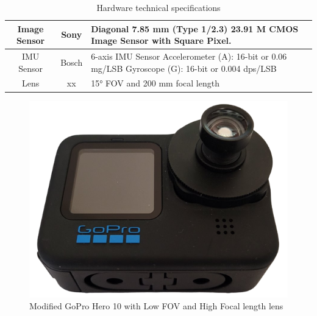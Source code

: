 \begin{table}[H]
    \centering
\begin{tabular}{ c| c | L }

     Image Sensor & 
     Sony & 
     Diagonal 7.85 mm (Type 1/2.3) 23.91 M CMOS Image Sensor with Square Pixel. \\
     \hline
     
     IMU Sensor & 
     Bosch & 
     6-axis IMU Sensor
     Accelerometer (A): 16-bit or 0.06 mg/LSB 
     Gyroscope (G): 16-bit or 0.004 dps/LSB  \\
     \hline
     
     Lens & 
     xx & 
     15° FOV and 200 mm focal length \\

\end{tabular}
    \caption{Hardware technical specifications}
    \label{tab:technical_details}
\end{table}

\begin{figure}[H]
    \centering
    \includegraphics[scale=0.25]{images/fig_chapter4/mod_gorpro_hero_10.png}
    \caption{Modified GoPro Hero 10 with Low FOV and High Focal length lens}
    \label{fig:mod_gopro_hero10}
\end{figure}

